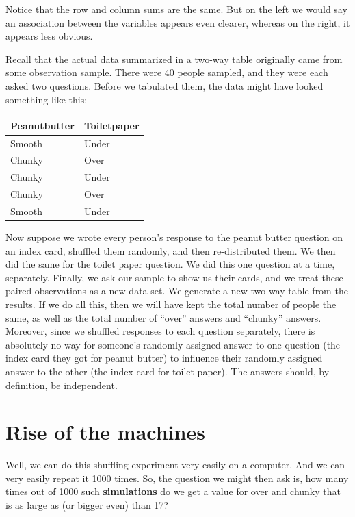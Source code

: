 \documentclass[openany]{book}
\begin{document}
Notice that the row and column sums are the same. But on the left we would say an association between the variables appears even clearer, whereas on the right, it appears less obvious.

Recall that the actual data summarized in a two-way table originally came from some observation sample. There were 40 people sampled, and they were each asked two questions. Before we tabulated them, the data might have looked something like this:

\begin{table}[!h]
\centering
\begin{tabular}{l|l}
\hline
Peanutbutter & Toiletpaper\\
\hline
Smooth & Under\\
\hline
Chunky & Over\\
\hline
Chunky & Under\\
\hline
Chunky & Over\\
\hline
Smooth & Under\\
\hline
\end{tabular}
\end{table}

Now suppose we wrote every person's response to the peanut butter question on an index card, shuffled them randomly, and then re-distributed them. We then did the same for the toilet paper question. We did this one question at a time, separately. Finally, we ask our sample to show us their cards, and we treat these paired observations as a new data set. We generate a new two-way table from the results. If we do all this, then we will have kept the total number of people the same, as well as the total number of ``over'' answers and ``chunky'' answers. Moreover, since we shuffled responses to each question separately, there is absolutely no way for someone's randomly assigned answer to one question (the index card they got for peanut butter) to influence their randomly assigned answer to the other (the index card for toilet paper). The answers should, by definition, be independent.

\hypertarget{rise-of-the-machines}{%
\section*{Rise of the machines}\label{rise-of-the-machines}}

Well, we can do this shuffling experiment very easily on a computer. And we can very easily repeat it 1000 times. So, the question we might then ask is, how many times out of 1000 such \textbf{simulations} do we get a value for over and chunky that is as large as (or bigger even) than 17?
\end{document}

